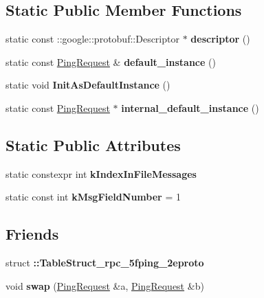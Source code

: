 \subsection*{Static Public Member Functions}
\begin{DoxyCompactItemize}
\item 
\mbox{\label{classcoappbrpc_1_1api_1_1PingRequest_a9199663eed5b934cd9ce803317b203b5}} 
static const \+::google\+::protobuf\+::\+Descriptor $\ast$ {\bfseries descriptor} ()
\item 
\mbox{\label{classcoappbrpc_1_1api_1_1PingRequest_ac4b415ccb3db8883a8e6333d3b28926b}} 
static const \hyperlink{classcoappbrpc_1_1api_1_1PingRequest}{Ping\+Request} \& {\bfseries default\+\_\+instance} ()
\item 
\mbox{\label{classcoappbrpc_1_1api_1_1PingRequest_a7a7fae08823a321a41c9add8d99df126}} 
static void {\bfseries Init\+As\+Default\+Instance} ()
\item 
\mbox{\label{classcoappbrpc_1_1api_1_1PingRequest_a5a6bf1896b6eab3ae57933fade4688e2}} 
static const \hyperlink{classcoappbrpc_1_1api_1_1PingRequest}{Ping\+Request} $\ast$ {\bfseries internal\+\_\+default\+\_\+instance} ()
\end{DoxyCompactItemize}
\subsection*{Static Public Attributes}
\begin{DoxyCompactItemize}
\item 
static constexpr int {\bfseries k\+Index\+In\+File\+Messages}
\item 
\mbox{\label{classcoappbrpc_1_1api_1_1PingRequest_ae73e8adefa50c7322b2cdf9e45f00110}} 
static const int {\bfseries k\+Msg\+Field\+Number} = 1
\end{DoxyCompactItemize}
\subsection*{Friends}
\begin{DoxyCompactItemize}
\item 
\mbox{\label{classcoappbrpc_1_1api_1_1PingRequest_a9bac0263ca50125d607502a4cace0488}} 
struct {\bfseries \+::\+Table\+Struct\+\_\+rpc\+\_\+5fping\+\_\+2eproto}
\item 
\mbox{\label{classcoappbrpc_1_1api_1_1PingRequest_ade061dda187d2a44aeb93a5c23236a9c}} 
void {\bfseries swap} (\hyperlink{classcoappbrpc_1_1api_1_1PingRequest}{Ping\+Request} \&a, \hyperlink{classcoappbrpc_1_1api_1_1PingRequest}{Ping\+Request} \&b)
\end{DoxyCompactItemize}


